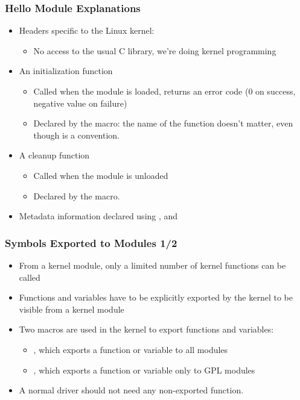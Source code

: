 \begin{frame}
  \frametitle{Hello Module Explanations}
  \begin{itemize}
  \item Headers specific to the Linux kernel: 
    \begin{itemize}
    \item No access to the usual C library, we're doing kernel
      programming
    \end{itemize}
  \item An initialization function
    \begin{itemize}
    \item Called when the module is loaded, returns an error code (0
      on success, negative value on failure)
    \item Declared by the  macro: the name of the
      function doesn't matter, even though 
      is a convention.
    \end{itemize}
  \item A cleanup function
    \begin{itemize}
    \item Called when the module is unloaded
    \item Declared by the  macro.
    \end{itemize}
  \item Metadata information declared using ,
     and 
  \end{itemize}
\end{frame}

\begin{frame}
  \frametitle{Symbols Exported to Modules 1/2}
  \begin{itemize}
  \item From a kernel module, only a limited number of kernel
    functions can be called
  \item Functions and variables have to be explicitly exported by the
    kernel to be visible from a kernel module
  \item Two macros are used in the kernel to export functions and
    variables:
    \begin{itemize}
    \item {}, which exports a function
      or variable to all modules
    \item {}, which exports a
      function or variable only to GPL modules
    \end{itemize}
  \item A normal driver should not need any non-exported function.
  \end{itemize}
\end{frame}

